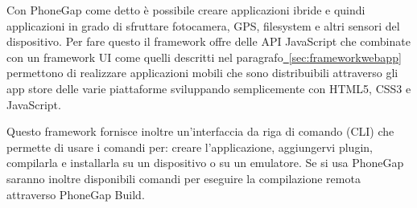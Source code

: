            Con PhoneGap come detto è possibile creare applicazioni ibride e quindi
            applicazioni in grado di sfruttare fotocamera, GPS, filesys\-tem e
            altri sensori del dispositivo. Per fare questo il frame\-work offre
            delle API JavaScript che combinate con un frame\-work UI come quelli descritti
            nel paragrafo\hyperref[sec:frameworkwebapp]{~\ref{sec:frameworkwebapp}}
            permettono di realizzare applicazioni mobili che sono distribuibili
            attraverso gli app store delle varie piattaforme sviluppando
            semplicemente con HTML5, CSS3 e JavaScript.

            Questo frame\-work fornisce inoltre un'interfaccia da riga di comando (CLI)
            che permette di usare i comandi per: creare l'applicazione, aggiungervi
            plugin, compilarla e installarla su un dispositivo o su un emulatore.
            Se si usa PhoneGap saranno inoltre disponibili comandi per eseguire
            la compilazione remota attraverso PhoneGap Build.

